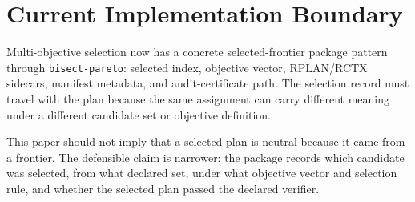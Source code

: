 \section{Current Implementation Boundary}

Multi-objective selection now has a concrete selected-frontier package pattern
through \texttt{bisect-pareto}: selected index, objective vector, RPLAN/RCTX
sidecars, manifest metadata, and audit-certificate path.  The selection record
must travel with the plan because the same assignment can carry different
meaning under a different candidate set or objective definition.

This paper should not imply that a selected plan is neutral because it came from
a frontier.  The defensible claim is narrower: the package records which
candidate was selected, from what declared set, under what objective vector and
selection rule, and whether the selected plan passed the declared verifier.
